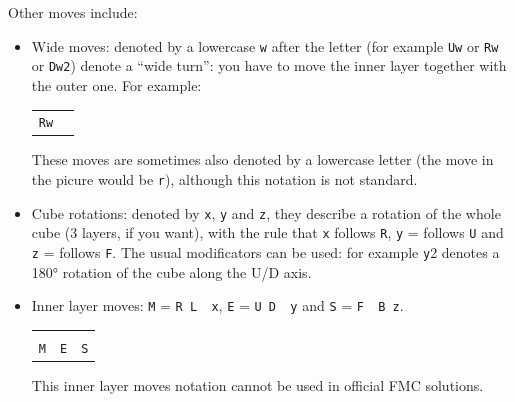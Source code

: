 \documentclass[11pt,a4paper]{book}
\newcommand{\p}{\textquotesingle}
\newcommand{\m}{\texttt}
\newcommand{\ps}{\p\,\,}
\begin{document}
Other moves include:
\begin{itemize}
\item Wide moves: denoted by a lowercase \m w after the letter (for example \m{Uw} or \m{Rw\p} or \m{Dw2}) denote a ``wide turn'': you have to move the inner layer together with the outer one. For example:

\begin{center}
\begin{tabular}{cc}
\m{Rw} \\

\end{tabular}
\end{center}

These moves are sometimes also denoted by a lowercase letter (the move in the picure would be \m{r}), although this notation is not standard.
\item Cube rotations: denoted by \m x, \m y and \m z, they describe a rotation of the whole cube (3 layers, if you want), with the rule that \m x follows \m R, \m y = follows \m U and \m z = follows \m F. The usual modificators can be used: for example \m y2 denotes a 180° rotation of the cube along the U/D axis.
\item Inner layer moves: \m M = \m{R L\ps x\p}, \m E = \m{U D\ps y\p} and \m{S} = \m{F\ps B z}.
\begin{center}
\begin{tabular}{|c|c|c|}
\hline
 &  & \\
\m M & \m E & \m S\\
\hline
\end{tabular}
\end{center}
This inner layer moves notation cannot be used in official FMC solutions.
\end{itemize}
\end{document}

